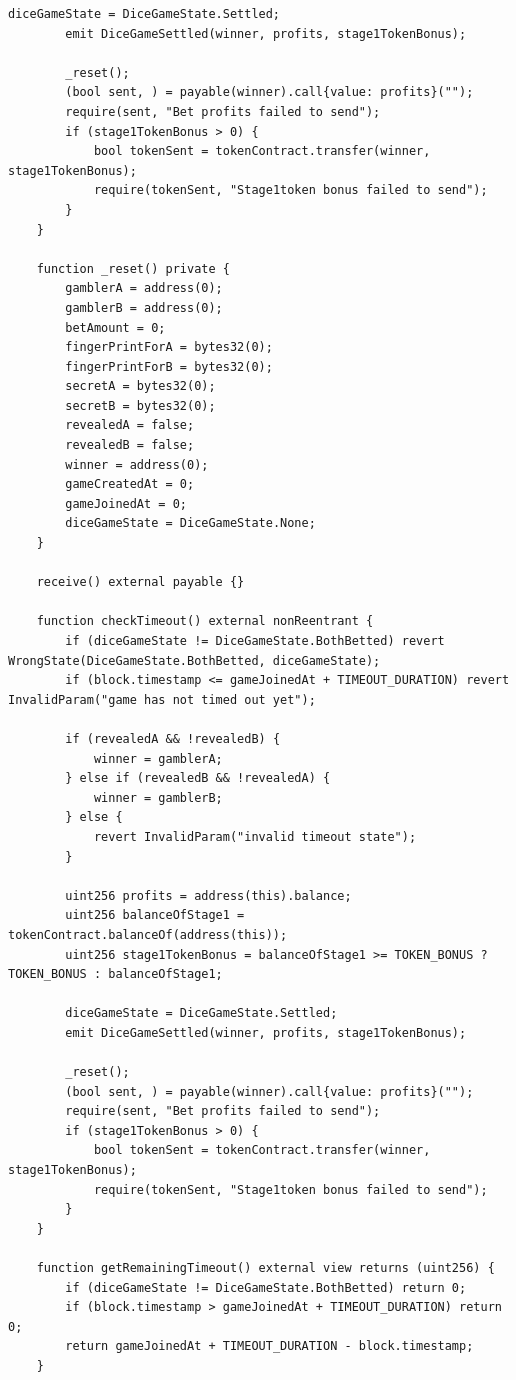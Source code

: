\documentclass[10pt,a4paper]{article}
\begin{document}
\begin{lstlisting}[caption={Stage2.sol}]
        diceGameState = DiceGameState.Settled;
        emit DiceGameSettled(winner, profits, stage1TokenBonus);

        _reset();
        (bool sent, ) = payable(winner).call{value: profits}("");
        require(sent, "Bet profits failed to send");
        if (stage1TokenBonus > 0) {
            bool tokenSent = tokenContract.transfer(winner, stage1TokenBonus);
            require(tokenSent, "Stage1token bonus failed to send");
        }
    }

    function _reset() private {
        gamblerA = address(0);
        gamblerB = address(0);
        betAmount = 0;
        fingerPrintForA = bytes32(0);
        fingerPrintForB = bytes32(0);
        secretA = bytes32(0);
        secretB = bytes32(0);
        revealedA = false;
        revealedB = false;
        winner = address(0);
        gameCreatedAt = 0;
        gameJoinedAt = 0;
        diceGameState = DiceGameState.None;
    }

    receive() external payable {}

    function checkTimeout() external nonReentrant {
        if (diceGameState != DiceGameState.BothBetted) revert WrongState(DiceGameState.BothBetted, diceGameState);
        if (block.timestamp <= gameJoinedAt + TIMEOUT_DURATION) revert InvalidParam("game has not timed out yet");
        
        if (revealedA && !revealedB) {
            winner = gamblerA;
        } else if (revealedB && !revealedA) {
            winner = gamblerB;
        } else {
            revert InvalidParam("invalid timeout state");
        }
        
        uint256 profits = address(this).balance;
        uint256 balanceOfStage1 = tokenContract.balanceOf(address(this));
        uint256 stage1TokenBonus = balanceOfStage1 >= TOKEN_BONUS ? TOKEN_BONUS : balanceOfStage1;

        diceGameState = DiceGameState.Settled;
        emit DiceGameSettled(winner, profits, stage1TokenBonus);

        _reset();
        (bool sent, ) = payable(winner).call{value: profits}("");
        require(sent, "Bet profits failed to send");
        if (stage1TokenBonus > 0) {
            bool tokenSent = tokenContract.transfer(winner, stage1TokenBonus);
            require(tokenSent, "Stage1token bonus failed to send");
        }
    }
    
    function getRemainingTimeout() external view returns (uint256) {
        if (diceGameState != DiceGameState.BothBetted) return 0;
        if (block.timestamp > gameJoinedAt + TIMEOUT_DURATION) return 0;
        return gameJoinedAt + TIMEOUT_DURATION - block.timestamp;
    }
    

\end{lstlisting}
\end{document}
